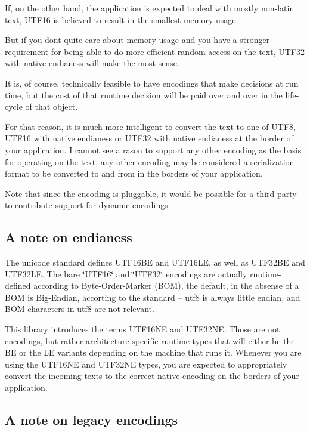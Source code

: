If, on the other hand, the application is expected to deal with mostly non-\/latin text, U\+T\+F16 is believed to result in the smallest memory usage.

But if you don\textquotesingle{}t quite care about memory usage and you have a stronger requirement for being able to do more efficient random access on the text, U\+T\+F32 with native endianess will make the most sense.

It is, of course, technically feasible to have encodings that make decisions at run time, but the cost of that runtime decision will be paid over and over in the life-\/cycle of that object.

For that reason, it is much more intelligent to convert the text to one of U\+T\+F8, U\+T\+F16 with native endianess or U\+T\+F32 with native endianess at the border of your application. I cannot see a rason to support any other encoding as the basis for operating on the text, any other encoding may be considered a serialization format to be converted to and from in the borders of your application.

Note that since the encoding is pluggable, it would be possible for a third-\/party to contribute support for dynamic encodings.

\subsection*{A note on endianess}

The unicode standard defines U\+T\+F16\+BE and U\+T\+F16\+LE, as well as U\+T\+F32\+BE and U\+T\+F32\+LE. The bare \char`\"{}\+U\+T\+F16\char`\"{} and \char`\"{}\+U\+T\+F32\char`\"{} encodings are actually runtime-\/defined according to Byte-\/\+Order-\/\+Marker (B\+OM), the default, in the absense of a B\+OM is Big-\/\+Endian, accorting to the standard -- utf8 is always little endian, and B\+OM characters in utf8 are not relevant.

This library introduces the terms U\+T\+F16\+NE and U\+T\+F32\+NE. Those are not encodings, but rather architecture-\/specific runtime types that will either be the BE or the LE variants depending on the machine that runs it. Whenever you are using the U\+T\+F16\+NE and U\+T\+F32\+NE types, you are expected to appropriately convert the incoming texts to the correct native encoding on the borders of your application.

\subsection*{A note on legacy encodings}

